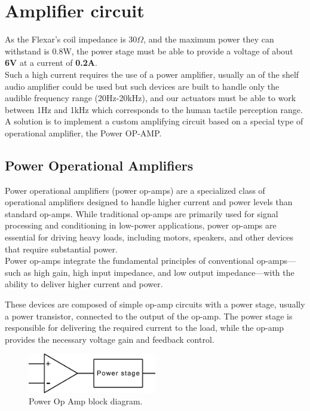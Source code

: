\section{Amplifier circuit}
As the Flexar's coil impedance is 30$\Omega$, and the maximum power they can withstand is 0.8W, the power stage must be able to provide a voltage of about \textbf{6V} at a current of \textbf{0.2A}. \\
Such a high current requires the use of a power amplifier, usually an of the shelf audio amplifier could be used but such devices are built to handle only the audible frequency range (20Hz-20kHz), and our actuators must be able to work between 1Hz and 1kHz which corresponds to the human tactile perception range. \\
A solution is to implement a custom amplifying circuit based on a special type of operational amplifier, the Power OP-AMP.

\subsection{Power Operational Amplifiers}
Power operational amplifiers (power op-amps) are a specialized class of operational amplifiers designed to handle higher current and power levels than standard op-amps. While traditional op-amps are primarily used for signal processing and conditioning in low-power applications, power op-amps are essential for driving heavy loads, including motors, speakers, and other devices that require substantial power. \\
Power op-amps integrate the fundamental principles of conventional op-amps—such as high gain, high input impedance, and low output impedance—with the ability to deliver higher current and power. 

These devices are composed of simple op-amp circuits with a power stage, usually a power transistor, connected to the output of the op-amp. The power stage is responsible for delivering the required current to the load, while the op-amp provides the necessary voltage gain and feedback control. \\
\begin{figure}
    \centering
    \includegraphics[width=0.5\textwidth]{Chapters/Chapter4/Figures/power_op-amp_block_diagram.png}
    \caption{Power Op Amp block diagram.}
    \label{fig:Power_Op_Amp}
\end{figure}

